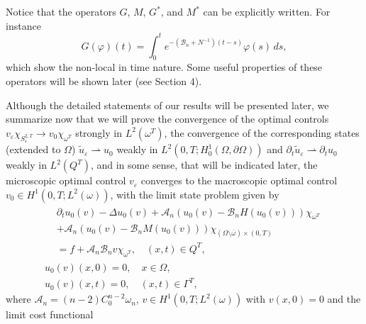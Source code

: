 \documentclass[reqno]{amsart}
\begin{document}
Notice that the operators $G$, $M$, $G^{\ast }$, and $M^{\ast }$ can be
explicitly written. For instance
\[
G(\varphi )(t)=\int _0^{t}e^{-(\mathcal{B}_n+N^{-1})(t-s)}\varphi (s)\,ds,
\]
which show the non-local in time nature. Some useful properties of these
operators will be shown later (see Section 4).

Although the detailed statements of our results will be presented later, we
summarize now that we will prove the convergence of the optimal controls 
$v_{\varepsilon }\chi _{S_{\varepsilon }^{2,T}}\to v_0\chi
_{\omega ^{T}}$ strongly in $L^2(\omega ^{T})$, the convergence of the
corresponding states (extended to $\Omega $) 
$\tilde{u}_{\varepsilon }\rightharpoonup u_0$ weakly in
$L^2(0,T;H_0^{1}(\Omega ,\partial \Omega ))$ and
$\partial _{t}\tilde{u}_{\varepsilon }\rightharpoonup
\partial _{t}u_0$ weakly in $L^2(Q^{T})$, and in some sense, that will
be indicated later, the microscopic optimal control $v_{\varepsilon }$
converges to the macroscopic optimal control $v_0\in
H^{1}(0,T;L^2(\omega ))$, with the limit state problem given by
\begin{equation}
\begin{gathered}
\begin{aligned}
&\partial _{t}u_0(v)-\Delta u_0(v)+\mathcal{A}_n(u_0(v)-\mathcal{B}%
_nH(u_0(v)))\chi _{\omega ^{T}}  \\
&+\mathcal{A}_n(u_0(v)-\mathcal{B}_nM(u_0(v)))\chi _{(\Omega
\setminus \overline{\omega })\times (0,T)} \\
&=f+\mathcal{A}_n\mathcal{B}_nv\chi _{\omega ^{T}}, \quad (x,t)\in Q^{T},
\end{aligned}\\
u_0(v)(x,0)=0, \quad x\in \Omega , \\
u_0(v)(x,t)=0, \quad (x,t)\in \Gamma ^{T},
\end{gathered}
\end{equation}
where $\mathcal{A}_n = (n-2)C^{n-2}_0 \omega_n$, 
$v\in H^{1}(0,T;L^2(\omega ))$ with $v(x,0)=0$ and the limit cost
functional 
\end{document}
